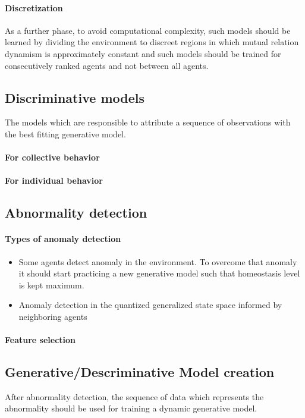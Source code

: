 \documentclass{article}
\begin{document}
			\paragraph{Discretization} As a further phase, to avoid computational complexity, such models should be learned by dividing the environment to discreet regions in which mutual relation dynamism is approximately constant and such models should be trained for consecutively ranked agents and not between all agents.   
		
		\subsection{Discriminative models}
			The models which are responsible to attribute a sequence of observations with the best fitting generative model.
			\paragraph{For collective behavior}
			\paragraph{For individual behavior}
				
		
		\subsection{Abnormality detection}
			\paragraph{Types of anomaly detection}
				\begin{itemize}
					\item Some agents detect anomaly in the environment. To overcome that anomaly it should start practicing a new generative model such that homeostasis level is kept maximum.  
					\item Anomaly detection in the quantized generalized state space informed by neighboring agents
				\end{itemize}
			\paragraph{Feature selection}
				\cite{kana}
		
		\subsection{Generative/Descriminative  Model creation}
			After abnormality detection, the sequence of data which represents the abnormality should be used for training a dynamic generative model. 
\end{document}
